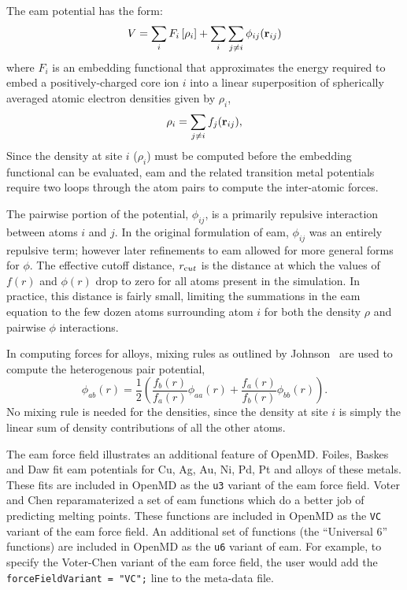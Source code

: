 \documentclass[]{book}
\begin{document}
The {\sc eam} potential has the form:
\begin{equation}
V  =  \sum_{i} F_{i}\left[\rho_{i}\right] + \sum_{i} \sum_{j \neq i}
\phi_{ij}({\bf r}_{ij})
\end{equation}
where $F_{i} $ is an embedding functional that approximates the energy
required to embed a positively-charged core ion $i$ into a linear
superposition of spherically averaged atomic electron densities given
by $\rho_{i}$,
\begin{equation}
\rho_{i}   =  \sum_{j \neq i} f_{j}({\bf r}_{ij}),
\end{equation}
Since the density at site $i$ ($\rho_i$) must be computed before the
embedding functional can be evaluated, {\sc eam} and the related
transition metal potentials require two loops through the atom pairs
to compute the inter-atomic forces.

The pairwise portion of the potential, $\phi_{ij}$, is a primarily
repulsive interaction between atoms $i$ and $j$. In the original
formulation of {\sc eam}\cite{Daw84}, $\phi_{ij}$ was an entirely
repulsive term; however later refinements to {\sc eam} allowed for
more general forms for $\phi$.\cite{Daw89} The effective cutoff
distance, $r_{{\text cut}}$ is the distance at which the values of
$f(r)$ and $\phi(r)$ drop to zero for all atoms present in the
simulation.  In practice, this distance is fairly small, limiting the
summations in the {\sc eam} equation to the few dozen atoms
surrounding atom $i$ for both the density $\rho$ and pairwise $\phi$
interactions.

In computing forces for alloys, mixing rules as outlined by
Johnson~\cite{johnson89} are used to compute the heterogenous pair
potential,
\begin{equation}
\label{eq:johnson}
\phi_{ab}(r)=\frac{1}{2}\left(
\frac{f_{b}(r)}{f_{a}(r)}\phi_{aa}(r)+
\frac{f_{a}(r)}{f_{b}(r)}\phi_{bb}(r)
\right).
\end{equation}
No mixing rule is needed for the densities, since the density at site
$i$ is simply the linear sum of density contributions of all the other
atoms.

The {\sc eam} force field illustrates an additional feature of {\sc
OpenMD}.  Foiles, Baskes and Daw fit {\sc eam} potentials for Cu, Ag,
Au, Ni, Pd, Pt and alloys of these metals.\cite{FBD86} These fits are
included in {\sc OpenMD} as the {\tt u3} variant of the {\sc eam} force
field.  Voter and Chen reparamaterized a set of {\sc eam} functions
which do a better job of predicting melting points.\cite{Voter:87}
These functions are included in {\sc OpenMD} as the {\tt VC} variant of
the {\sc eam} force field.  An additional set of functions (the
``Universal 6'' functions) are included in {\sc OpenMD} as the {\tt u6}
variant of {\sc eam}.  For example, to specify the Voter-Chen variant
of the {\sc eam} force field, the user would add the {\tt
forceFieldVariant = "VC";} line to the meta-data file.
\end{document}
